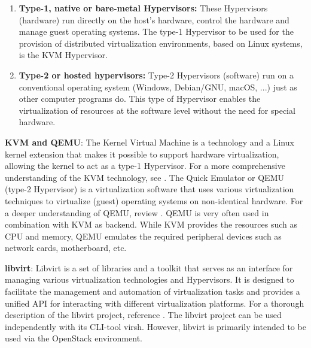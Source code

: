 \documentclass[]{article}
\begin{document}
\begin{enumerate}[label=\textbullet]
	\item\textbf{Type-1, native or bare-metal Hypervisors:}
	These Hypervisors (hardware) run directly on the host's hardware, control the hardware and manage guest operating systems. 
	The type-1 Hypervisor to be used for the provision of distributed virtualization environments, based on Linux systems, is the KVM Hypervisor. 
		
	\item\textbf{Type-2 or hosted hypervisors:}
	Type-2 Hypervisors (software) run on a conventional operating system (Windows, Debian/GNU, macOS, ...) just as other computer programs do.
	This type of Hypervisor enables the virtualization of resources at the software level without the need for special hardware. 
\end{enumerate}

\textbf{KVM and QEMU}:
The Kernel Virtual Machine is a technology and a Linux kernel extension that makes it possible to support hardware virtualization, allowing the kernel to act as a type-1 Hypervisor.
For a more comprehensive understanding of the KVM technology, see \cite{KVMDoc}.
The Quick Emulator or QEMU (type-2 Hypervisor) is a virtualization software that uses various virtualization techniques to virtualize (guest) operating systems on non-identical hardware.
For a deeper understanding of QEMU, review \cite{QEMUDoc}.
QEMU is very often used in combination with KVM as backend.
While KVM provides the resources such as CPU and memory, QEMU emulates the required peripheral devices such as network cards, motherboard, etc.
\newline

\textbf{libvirt}:
Libvirt is a set of libraries and a toolkit that serves as an interface for managing various virtualization technologies and Hypervisors. 
It is designed to facilitate the management and automation of virtualization tasks and provides a unified API for interacting with different virtualization platforms.
For a thorough description of the libvirt project, reference \cite{libvirtDoc}.
The libvirt project can be used independently with its CLI-tool virsh. 
However, libvirt is primarily intended to be used via the OpenStack environment.
\end{document}

